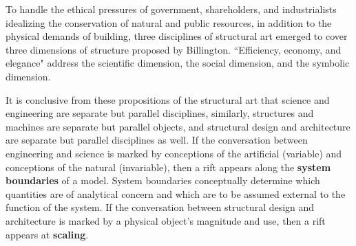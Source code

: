 To handle the ethical pressures of government, shareholders, and industrialists idealizing the conservation of natural and public resources, in addition to the physical demands of building, three disciplines of structural art emerged to cover three dimensions of structure proposed by Billington. ``Efficiency, economy, and elegance" address the scientific dimension, the social dimension, and the symbolic dimension. \cite[p5,16,17]{TOWERANDBRIDGE}




It is conclusive from these propositions of the structural art that science and engineering are separate but parallel disciplines, similarly, structures and machines are separate but parallel objects, and structural design and architecture are separate but parallel disciplines as well. If the conversation between engineering and science is marked by conceptions of the artificial (variable) and conceptions of the natural (invariable), then a rift appears along the \textbf{system boundaries} of a model. System boundaries conceptually determine which quantities are of analytical concern and which are to be assumed external to the function of the system. If the conversation between structural design and architecture is marked by a physical object's magnitude and use, then a rift appears at \textbf{scaling}.

%



%
